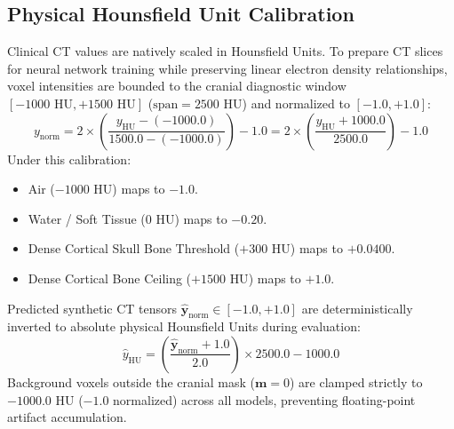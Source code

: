 \subsection{Physical Hounsfield Unit Calibration}
Clinical CT values are natively scaled in Hounsfield Units. To prepare CT slices for neural network training while preserving linear electron density relationships, voxel intensities are bounded to the cranial diagnostic window $[-1000\text{ HU}, +1500\text{ HU}]$ ($\text{span} = 2500\text{ HU}$) and normalized to $[-1.0, +1.0]$:
\begin{equation}
y_{\text{norm}} = 2 \times \left( \frac{y_{\text{HU}} - (-1000.0)}{1500.0 - (-1000.0)} \right) - 1.0 = 2 \times \left( \frac{y_{\text{HU}} + 1000.0}{2500.0} \right) - 1.0
\label{eq:hu_norm_implementation}
\end{equation}
Under this calibration:
\begin{itemize}
    \item Air ($-1000\text{ HU}$) maps to $-1.0$.
    \item Water / Soft Tissue ($0\text{ HU}$) maps to $-0.20$.
    \item Dense Cortical Skull Bone Threshold ($+300\text{ HU}$) maps to $+0.0400$.
    \item Dense Cortical Bone Ceiling ($+1500\text{ HU}$) maps to $+1.0$.
\end{itemize}
Predicted synthetic CT tensors $\mathbf{\hat{y}}_{\text{norm}} \in [-1.0, +1.0]$ are deterministically inverted to absolute physical Hounsfield Units during evaluation:
\begin{equation}
\hat{y}_{\text{HU}} = \left( \frac{\mathbf{\hat{y}}_{\text{norm}} + 1.0}{2.0} \right) \times 2500.0 - 1000.0
\label{eq:hu_inversion_implementation}
\end{equation}
Background voxels outside the cranial mask ($\mathbf{m} = 0$) are clamped strictly to $-1000.0\text{ HU}$ ($-1.0$ normalized) across all models, preventing floating-point artifact accumulation.

